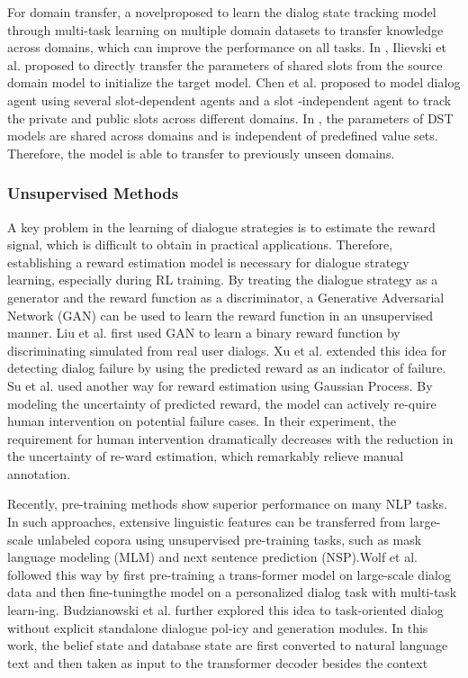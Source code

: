 \documentclass[10pt,twocolumn,letterpaper]{article}
\begin{document}
For domain transfer, a novel\cite{mrkvsic2015multi}proposed to learn the dialog state tracking model through multi-task learning on multiple domain datasets to transfer knowledge across domains, which can improve the performance on all tasks. In \cite{ilievski2018goal}, Ilievski et al. proposed to directly transfer the parameters of shared slots from the source domain model to initialize the target model. Chen et al. \cite{chen2018policy}proposed to model dialog agent using several slot-dependent agents and a slot -independent agent to track the private and public slots across different domains. In \cite{rastogi2017scalable,ren2018towards}, the parameters of DST models are shared across domains and is independent of predefined value sets. Therefore, the model is able to transfer to previously unseen domains.
 \subsubsection{Unsupervised Methods}
 
A key problem in the learning of dialogue strategies is to estimate the reward signal, which is difficult to obtain in practical applications. Therefore, establishing a reward estimation model is necessary for dialogue strategy learning, especially during RL training. By treating the dialogue strategy as a generator and the reward function as a discriminator, a Generative Adversarial Network (GAN) can be used to learn the reward function in an unsupervised manner.  Liu et al.  \cite{liu2018adversarial} first used GAN to learn a binary reward function by discriminating simulated from real user dialogs.  Xu et al.  \cite{xu2019unsupervised} extended this idea for detecting dialog failure by using the predicted reward as an indicator of failure.  Su et al.  \cite{su2016line}used another way for reward estimation using Gaussian Process. By modeling the uncertainty of predicted reward,  the model can actively re-quire human intervention on potential failure cases.  In their experiment, the requirement for human intervention dramatically decreases with the reduction in the uncertainty of re-ward  estimation,  which  remarkably  relieve  manual  annotation.

Recently, pre-training methods show superior performance on many NLP tasks. In such approaches, extensive linguistic features  can  be  transferred  from  large-scale  unlabeled  copora using unsupervised pre-training tasks, such as mask language modeling (MLM) and next sentence prediction (NSP).Wolf et al. \cite{wolf2019transfertransfo} followed this way by first pre-training a trans-former model on large-scale dialog data and then fine-tuningthe model on a personalized dialog task with multi-task learn-ing.  Budzianowski et al.  \cite{budzianowski2019hello} further explored this idea to task-oriented dialog without explicit standalone dialogue pol-icy and generation modules. In this work, the belief state and database state are first converted to natural language text and then  taken  as  input  to  the  transformer  decoder  besides  the context
\end{document}
